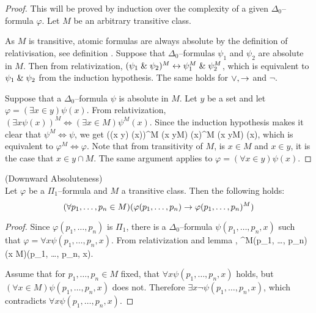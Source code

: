 \begin{proof}
This will be proved by induction over the complexity of a given $\Delta_0$–formula $\varphi$. Let $M$ be an arbitrary transitive class. 

As $M$ is transitive, atomic formulas are always absolute by the definition of relativisation, see definition .
Suppose that $\Delta_0$–formulas $\psi_1$ and $\psi_2$ are absolute in $M$. 
Then from relativization, $(\psi_1 \mathrel{\&} \psi_2)^M \leftrightarrow \psi_1^M \mathrel{\&} \psi_2^M$, which is equivalent to $\psi_1 \mathrel{\&} \psi_2$ from the induction hypothesis. 
The same holds for $\lor, \rightarrow$ and $\neg$.

Suppose that a $\Delta_0$–formula $\psi$ is absolute in $M$. Let $y$ be a set and let $\varphi = (\exists x \in y) \psi(x)$. 
From relativization, $(\exists x \psi(x))^M \iff (\exists x \in M) \psi^M(x)$. 
Since the induction hypothesis makes it clear that $\psi^M \iff \psi$, we get 
\beq
((\exists x \in y) \psi(x))^M \iff (\exists x \in y\cap M) \psi(x)^M \iff (\exists x \in y\cap M) \psi(x)\mbox{,}
\eeq
which is equivalent to $\varphi^M \iff \varphi$. Note that from transitivity of $M$, is $x \in M$ and $x \in y$, it is the case that $x \in y \cap M$. %
The same argument applies to $\varphi = (\forall x \in y) \psi(x)$.
\end{proof}

\begin{lemma}{(Downward Absoluteness)}\label{lemma:downward_absoluteness}\\
Let $\varphi$ be a $\Pi_1$–formula and $M$ a transitive class. Then the following holds:
\begin{equation}
(\forall p_1, \ldots, p_n \in M)(\varphi(p_1, \ldots, p_n) \rightarrow \varphi(p_1, \ldots, p_n)^M)
\end{equation}
\end{lemma}
\begin{proof}
Since $\varphi(p_1, \ldots, p_n)$ is $\Pi_1$, there is a $\Delta_0$–formula $\psi(p_1, \ldots, p_n, x)$ such that $\varphi = \forall x \psi(p_1, \ldots, p_n, x)$. 
From relativization and lemma ,
\beq
\varphi^M(p_1, \ldots, p_n) \iff (\forall x \in M)\psi(p_1, \ldots, p_n, x)\mbox{.}
\eeq

Assume that for $p_1, \ldots, p_n \in M$ fixed, that $\forall x \psi(p_1, \ldots, p_n, x)$ holds, but $(\forall x \in M)\psi(p_1, \ldots, p_n, x)$ does not. 
Therefore $\exists x \neg \psi(p_1, \ldots, p_n, x)$, which contradicts $\forall x \psi(p_1, \ldots, p_n, x)$.
\end{proof}


